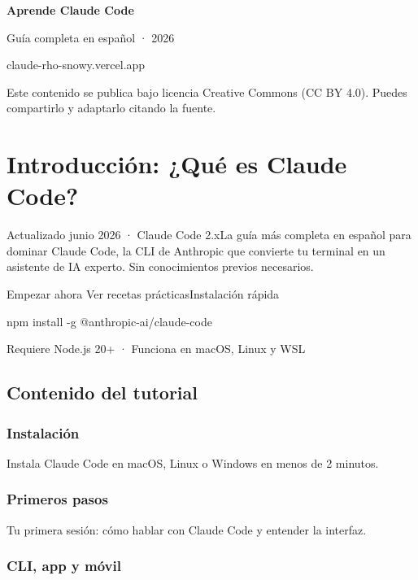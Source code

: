 \documentclass[11pt,a4paper]{report}
\begin{document}
\begin{titlepage}
\centering
\vspace*{3cm}
{\Huge\bfseries\color{accent} Aprende Claude Code\par}
\vspace{0.8cm}
{\Large Guía completa en español · 2026\par}
\vspace{1.2cm}
{\large claude-rho-snowy.vercel.app\par}
\vfill
Este contenido se publica bajo licencia Creative Commons (CC BY 4.0). Puedes compartirlo y adaptarlo citando la fuente.
\end{titlepage}
\tableofcontents
\clearpage
\chapter{Introducción: ¿Qué es Claude Code?}

Actualizado junio 2026 · Claude Code 2.xLa guía más completa en español para dominar Claude Code, la CLI de Anthropic que convierte tu terminal en un asistente de IA experto. Sin conocimientos previos necesarios.

Empezar ahora  Ver recetas prácticasInstalación rápida

\begin{codebox}
npm install -g @anthropic-ai/claude-code
\end{codebox}

Requiere Node.js 20+ · Funciona en macOS, Linux y WSL

\section{Contenido del tutorial}

\subsection{Instalación}

Instala Claude Code en macOS, Linux o Windows en menos de 2 minutos.

\subsection{Primeros pasos}

Tu primera sesión: cómo hablar con Claude Code y entender la interfaz.

\subsection{CLI, app y móvil}
\end{document}
